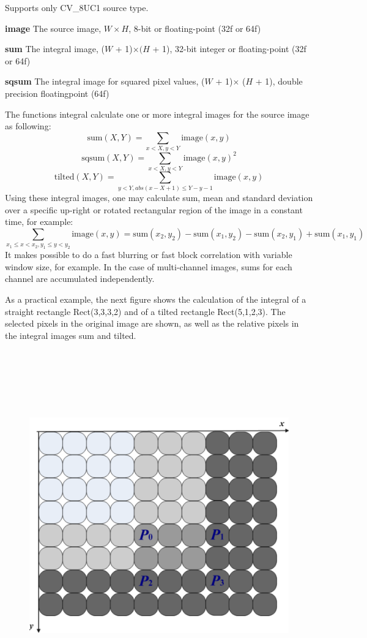 \documentclass{article}
\begin{document}
Supports only CV{\_}8UC1 source type.

\textbf{image }The source image, $W\times H$, 8-bit or floating-point (32f or
64f)

\textbf{sum }The integral image, ($W$ + 1)$\times (H$ + 1), 32-bit integer or
floating-point (32f or 64f)

\textbf{sqsum }The integral image for squared pixel values, ($W$ + 1)$\times $
($H$ + 1), double precision floatingpoint (64f)

The functions integral calculate one or more integral images for the source
image as following:
\[
\mbox{sum}(X,Y)=\sum\limits_{x<X,y<Y} {\mbox{image}(x,y)}
\]
\[
\mbox{sqsum}(X,Y)=\sum\limits_{x<X,y<Y} {\mbox{image}(x,y)^2}
\]
\[
\mbox{tilted}(X,Y)=\sum\limits_{y<Y,abs(x-X+1)\le Y-y-1} {\mbox{image}(x,y)}
\]
Using these integral images, one may calculate sum, mean and standard
deviation over a specific up-right or rotated rectangular region of the
image in a constant time, for example:
\[
\sum\limits_{x_1 \le x<x_2 ,y_1 \le y<y_2 } {\mbox{image}(x,y)}
=\mbox{sum}(x_2 ,y_2 )-\mbox{sum}(x_1 ,y_2 )-\mbox{sum}(x_2 ,y_1
)+\mbox{sum}(x_1 ,y_1 )
\]
It makes possible to do a fast blurring or fast block correlation with
variable window size, for example. In the case of multi-channel images, sums
for each channel are accumulated independently.

As a practical example, the next figure shows the calculation of the
integral of a straight rectangle Rect(3,3,3,2) and of a tilted rectangle
Rect(5,1,2,3). The selected pixels in the original image are shown, as well
as the relative pixels in the integral images sum and tilted.

\begin{figure}[htbp]
\centerline{\includegraphics[width=7.15in,height=5.94in]{User2.pdf}}
\label{fig2}
\end{figure}
\end{document}
